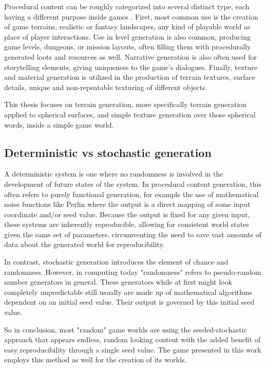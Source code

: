 \documentclass[12pt]{report}
\begin{document}
Procedural content can be roughly categorized into several distinct type, each having a different purpose inside games \cite{pcgsmith2012, korn2017game}. First, most common use is the creation of game terrains, realistic or fantasy landscapes, any kind of playable world as place of player interactions. Use in level generation is also common, producing game levels, dungeons, or mission layouts, often filling them with procedurally generated loots and resources as well. Narrative generation is also often used for storytelling elements, giving uniqueness to the game's dialogues. Finally, texture and material generation is utilized in the production of terrain textures, surface details, unique and non-repeatable texturing of different objects.

This thesis focuses on terrain generation, more specifically terrain generation applied to spherical surfaces, and simple texture generation over those spherical words, inside a simple game world.

\subsection{Deterministic vs stochastic generation}

A deterministic system is one where no randomness is involved in the development of future states of the system. In procedural content generation, this often refers to purely functional generation, for example the use of mathematical noise functions like Perlin where the output is a direct mapping of some input coordinate and/or seed value. Because the output is fixed for any given input, these systems are inherently reproducible, allowing for consistent world states given the same set of parameters, circumventing the need to save vast amounts of data about the generated world for reproducibility.

In contrast, stochastic generation introduces the element of chance and randomness. However, in computing today "randomness" refers to pseudo-random number generators in general. These generators while at first might look completely unpredictable still usually are made up of mathematical algorithms dependent on an initial seed value. Their output is governed by this initial seed value.

So in conclusion, most "random" game worlds are using the seeded-stochastic approach that appears endless, random looking content with the added benefit of easy reproducibility through a single seed value. The game presented in this work employs this method as well for the creation of its worlds.
\end{document}
